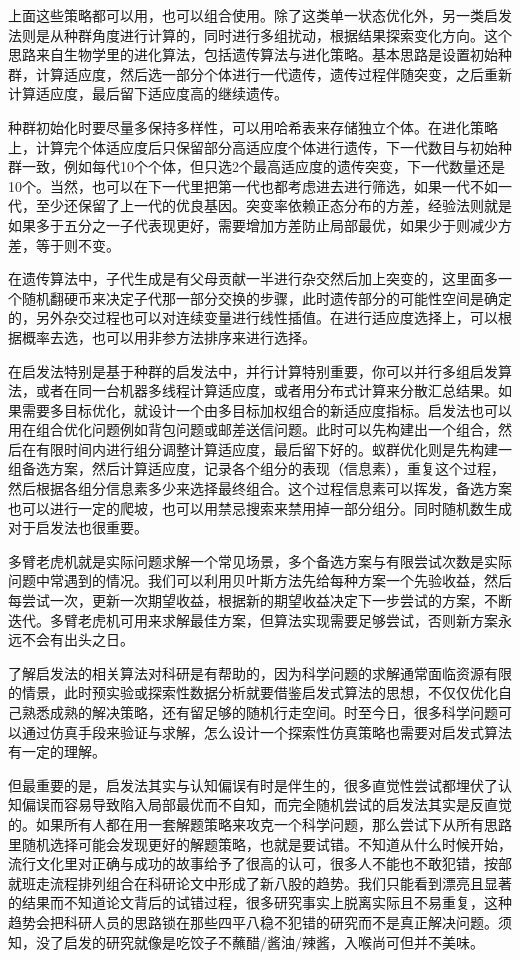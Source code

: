 \documentclass[]{tufte-book}
\begin{document}
上面这些策略都可以用，也可以组合使用。除了这类单一状态优化外，另一类启发法则是从种群角度进行计算的，同时进行多组扰动，根据结果探索变化方向。这个思路来自生物学里的进化算法，包括遗传算法与进化策略。基本思路是设置初始种群，计算适应度，然后选一部分个体进行一代遗传，遗传过程伴随突变，之后重新计算适应度，最后留下适应度高的继续遗传。

种群初始化时要尽量多保持多样性，可以用哈希表来存储独立个体。在进化策略上，计算完个体适应度后只保留部分高适应度个体进行遗传，下一代数目与初始种群一致，例如每代10个个体，但只选2个最高适应度的遗传突变，下一代数量还是10个。当然，也可以在下一代里把第一代也都考虑进去进行筛选，如果一代不如一代，至少还保留了上一代的优良基因。突变率依赖正态分布的方差，经验法则就是如果多于五分之一子代表现更好，需要增加方差防止局部最优，如果少于则减少方差，等于则不变。

在遗传算法中，子代生成是有父母贡献一半进行杂交然后加上突变的，这里面多一个随机翻硬币来决定子代那一部分交换的步骤，此时遗传部分的可能性空间是确定的，另外杂交过程也可以对连续变量进行线性插值。在进行适应度选择上，可以根据概率去选，也可以用非参方法排序来进行选择。

在启发法特别是基于种群的启发法中，并行计算特别重要，你可以并行多组启发算法，或者在同一台机器多线程计算适应度，或者用分布式计算来分散汇总结果。如果需要多目标优化，就设计一个由多目标加权组合的新适应度指标。启发法也可以用在组合优化问题例如背包问题或邮差送信问题。此时可以先构建出一个组合，然后在有限时间内进行组分调整计算适应度，最后留下好的。蚁群优化则是先构建一组备选方案，然后计算适应度，记录各个组分的表现（信息素），重复这个过程，然后根据各组分信息素多少来选择最终组合。这个过程信息素可以挥发，备选方案也可以进行一定的爬坡，也可以用禁忌搜索来禁用掉一部分组分。同时随机数生成对于启发法也很重要。

多臂老虎机就是实际问题求解一个常见场景，多个备选方案与有限尝试次数是实际问题中常遇到的情况。我们可以利用贝叶斯方法先给每种方案一个先验收益，然后每尝试一次，更新一次期望收益，根据新的期望收益决定下一步尝试的方案，不断迭代。多臂老虎机可用来求解最佳方案，但算法实现需要足够尝试，否则新方案永远不会有出头之日。

了解启发法的相关算法对科研是有帮助的，因为科学问题的求解通常面临资源有限的情景，此时预实验或探索性数据分析就要借鉴启发式算法的思想，不仅仅优化自己熟悉成熟的解决策略，还有留足够的随机行走空间。时至今日，很多科学问题可以通过仿真手段来验证与求解，怎么设计一个探索性仿真策略也需要对启发式算法有一定的理解。

但最重要的是，启发法其实与认知偏误有时是伴生的，很多直觉性尝试都埋伏了认知偏误而容易导致陷入局部最优而不自知，而完全随机尝试的启发法其实是反直觉的。如果所有人都在用一套解题策略来攻克一个科学问题，那么尝试下从所有思路里随机选择可能会发现更好的解题策略，也就是要试错。不知道从什么时候开始，流行文化里对正确与成功的故事给予了很高的认可，很多人不能也不敢犯错，按部就班走流程排列组合在科研论文中形成了新八股的趋势。我们只能看到漂亮且显著的结果而不知道论文背后的试错过程，很多研究事实上脱离实际且不易重复，这种趋势会把科研人员的思路锁在那些四平八稳不犯错的研究而不是真正解决问题。须知，没了启发的研究就像是吃饺子不蘸醋/酱油/辣酱，入喉尚可但并不美味。
\end{document}
